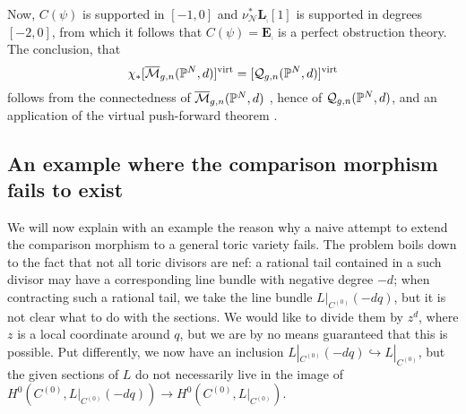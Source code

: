 \begin{center}
\end{center}

Now, $C(\psi)$ is supported in $[-1,0]$ \cite[Lemma 4.20]{Manolache-Push} and $\nu_{\mathcal{N}}^*\mathbf L_{\tilde{\comp}}{[1]}$ is supported in degrees $[-2,0]$, from which it follows that $C(\psi)=\mathbf E_{\comp}$ is a perfect obstruction theory. The conclusion, that
\begin{equation*} \chi_*[\overline{\mathcal{M}}_{g,n}(\mathbb P^N,d)]^{\operatorname{virt}}=[\mathcal{Q}_{g,n}(\mathbb P^N,d)]^{\operatorname{virt}} \end{equation*}
follows from the connectedness of $\overline{\mathcal{M}}_{g,n}(\mathbb P^N,d)$ \cite{KP}, hence of $\mathcal{Q}_{g,n}(\mathbb P^N,d)$, and an application of the virtual push-forward theorem \cite[Proposition 4.21]{Manolache-Push}.

\subsection{An example where the comparison morphism fails to exist}
We will now explain with an example the reason why a naive attempt to extend the comparison morphism to a general toric variety fails. The problem boils down to the fact that not all toric divisors are nef: a rational tail contained in a such divisor may have a corresponding line bundle with negative degree $-d$; when contracting such a rational tail, we take the line bundle $L|_{C^{(0)}}(-dq)$, but it is not clear what to do with the sections. We would like to divide them by $z^d$, where $z$ is a local coordinate around $q$, but we are by no means guaranteed that this is possible. Put differently, we now have an inclusion $L|_{C^{(0)}}(-dq)\hookrightarrow L|_{C^{(0)}}$, but the given sections of $L$ do not necessarily live in the image of $H^0(C^{(0)},L|_{C^{(0)}}(-dq))\to H^0(C^{(0)},L|_{C^{(0)}})$.

